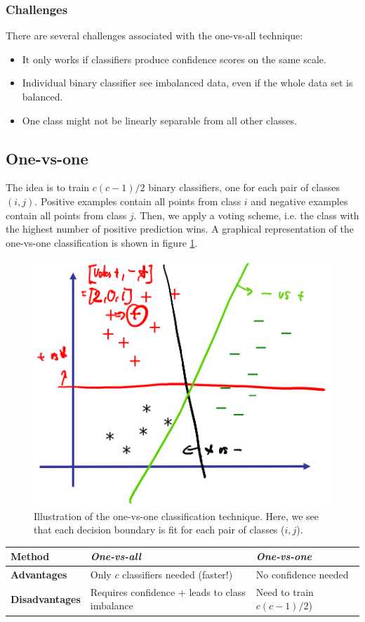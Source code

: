 \documentclass[a4paper,10pt,twoside]{article}
\begin{document}
\subsubsection{Challenges}
There are several challenges associated with the one-vs-all technique:
\begin{itemize}
    \item It only works if classifiers produce confidence scores on the same scale.
    \item Individual binary classifier see imbalanced data, even if the whole data set is balanced.
    \item One class might not be linearly separable from all other classes.
\end{itemize}

\subsection{One-vs-one}

The idea is to train $c(c-1)/2$ binary classifiers, one for each pair of classes $(i,j)$. Positive examples contain all points from class $i$ and negative examples contain all points from class $j$. Then, we apply a voting scheme, i.e. the class with the highest number of positive prediction wins. A graphical representation of the one-vs-one classification is shown in figure \ref{one-vs-one}.

\begin{figure}
    \centering
    \includegraphics[width=.5\textwidth]{figures/one-vs-one.png}
    \caption{Illustration of the one-vs-one classification technique. Here, we see that each decision boundary is fit for each pair of classes ($i,j$).}
    \label{one-vs-one}
\end{figure}

\begin{table}
    \centering
    \begin{tabular}{lll}
        \toprule
        \textbf{Method} & \textit{One-vs-all} & \textit{One-vs-one} \\
        \midrule
        \textbf{Advantages} & Only $c$ classifiers needed (faster!) & No confidence needed\\
        \textbf{Disadvantages} & Requires confidence + leads to class imbalance & Need to train $c(c-1)/2$)\\
        \bottomrule
    \end{tabular}
\end{table}
\end{document}
